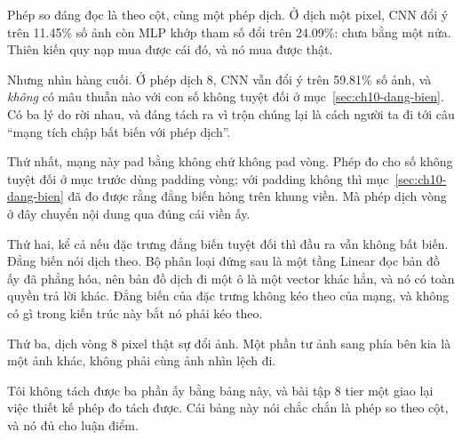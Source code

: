 Phép so đáng đọc là theo cột, cùng một phép dịch. Ở dịch một pixel, CNN đổi ý
trên 11.45\% số ảnh còn MLP khớp tham số đổi trên 24.09\%: chưa bằng một nửa.
Thiên kiến quy nạp mua được cái đó, và nó mua được thật.

Nhưng nhìn hàng cuối. Ở phép dịch 8, CNN vẫn đổi ý trên 59.81\% số ảnh, và
\emph{không} có mâu thuẫn nào với con số không tuyệt đối ở
mục~\ref{sec:ch10-dang-bien}. Có ba lý do rời nhau, và đáng tách ra vì trộn
chúng lại là cách người ta đi tới câu \enquote{mạng tích chập bất biến với phép
dịch}.

Thứ nhất, mạng này pad bằng không chứ không pad vòng. Phép đo cho số không
tuyệt đối ở mục trước dùng padding vòng; với padding không thì
mục~\ref{sec:ch10-dang-bien} đã đo được rằng đẳng biến hỏng trên khung viền. Mà
phép dịch vòng ở đây chuyển nội dung qua đúng cái viền ấy.

Thứ hai, kể cả nếu đặc trưng đẳng biến tuyệt đối thì đầu ra vẫn không bất biến.
Đẳng biến nói  dịch theo. Bộ phân loại đứng
sau là một tầng Linear đọc bản đồ ấy đã phẳng hóa, nên bản đồ dịch đi một ô là
một vector khác hẳn, và nó có toàn quyền trả lời khác. Đẳng biến của đặc trưng
không kéo theo  của mạng, và không có gì trong kiến
trúc này bắt nó phải kéo theo.

Thứ ba, dịch vòng 8 pixel thật sự đổi ảnh. Một phần tư ảnh sang phía bên kia là
một ảnh khác, không phải cùng ảnh nhìn lệch đi.

Tôi không tách được ba phần ấy bằng bảng này, và bài tập 8 tier một giao lại
việc thiết kế phép đo tách được. Cái bảng này nói chắc chắn là phép so theo
cột, và nó đủ cho luận điểm.
